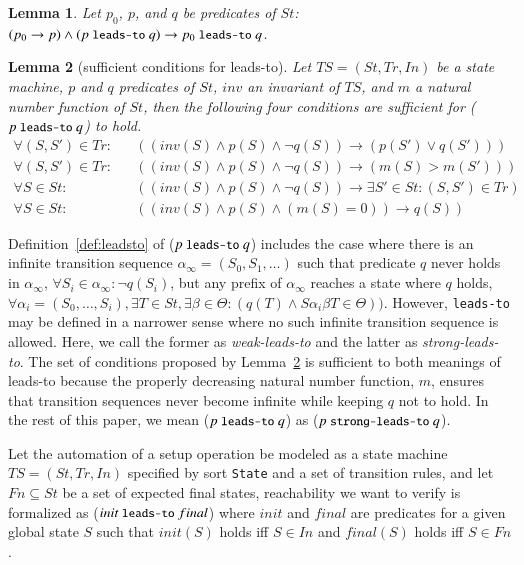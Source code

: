 \documentclass[12pt]{report}
\newtheorem{lemma}{Lemma}
\newcommand{\ra}{\rightarrow}
\newcommand{\mbstt}[1]{\mbox{\small{\tt {#1}}}}
\newcommand{\stt}[1]{{\small{\tt {#1}}}}
\begin{document}
\begin{lemma}
\label{def:p0leadstoq}
  Let $p_0$, $p$, and $q$ be predicates of $\mathit{St}$:
  $(p_0 \ra p) \land (p~\mbstt{leads-to}~q) \ra
  p_0~\mbstt{leads-to}~q$.
\end{lemma}

\begin{lemma}[sufficient conditions for leads-to]
\label{def:sufcond}
  Let $TS=(\mathit{St},\mathit{Tr},In)$ be a state machine, $p$ and $q$ predicates of
  $\mathit{St}$, $inv$ an invariant of $TS$, and $m$ a natural number
  function of $\mathit{St}$, then the following four conditions are sufficient
  for ($p~\mbstt{leads-to}~q$) to hold.
\begin{eqnarray*}
\forall (S,S')\in \mathit{Tr}:&&((inv(S)\land p(S)\land\neg q(S))\ra(p(S')\lor q(S')))\\
\forall (S,S')\in \mathit{Tr}:&&((inv(S)\land p(S)\land\neg q(S))\ra(m(S) > m(S')))\\
\forall S\in \mathit{St}:&&((inv(S)\land p(S)\land\neg q(S))\ra\exists S'\in \mathit{St}:(S,S')\in \mathit{Tr})\\
\forall S\in \mathit{St}:&&((inv(S)\land p(S)\land(m(S) = 0)) \ra q(S))
\end{eqnarray*}
\end{lemma}
Definition~\ref{def:leadsto} of ($p~\mbstt{leads-to}~q$) includes the
case where there is an infinite transition sequence
$\alpha_{\infty}\!=\!(\mathit{S_0},\mathit{S_1},\dots)$ such that predicate $q$ never holds in $\alpha_{\infty}$,
$\forall \mathit{S_i}\!\in\!\alpha_{\infty}\!:\!\neg q(\mathit{S_i})$,
but any prefix of $\alpha_{\infty}$ reaches a state where $q$ holds,
$\forall \alpha_i\!=\!(\mathit{S_0},\dots,\mathit{S_i}),\exists T\!\in\!\mathit{St},
\exists\beta\!\in\!\Theta\!:\!(q(T) \land S\alpha_i\beta T\in \Theta))$.
However, \stt{leads-to} may be
defined in a narrower sense where no such infinite transition sequence
is allowed. Here, we call the former as {\it weak-leads-to} and the
latter as {\it strong-leads-to}. The set of conditions proposed by
Lemma~\ref{def:sufcond} is sufficient to both meanings of leads-to
because the properly decreasing natural number function, $m$, ensures
that transition sequences never become infinite while keeping $q$ not
to hold. In the rest of this paper, we mean ($p~\mbstt{leads-to}~q$)
as ($p~\mbstt{strong-leads-to}~q$).

Let the automation of a setup operation be modeled as a state machine
$TS=(\mathit{St},\mathit{Tr},In)$ specified by sort {\tt State} and a set of transition
rules, and let
$Fn\subseteq \mathit{St}$ be a set of expected final states, reachability
we want to verify is formalized as ($init~\mbstt{leads-to}~final$) where
$init$ and $final$ are predicates for a given global state $S$ such
that $init(S)$ holds iff $S \in In$ and $final(S)$ holds iff $S \in
Fn$. 
\end{document}
